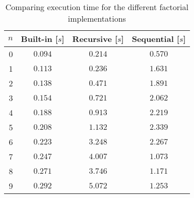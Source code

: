 \begin{table}[htp]
	\begin{center}
	\caption{Comparing execution time for
the different factorial implementations}
	\label{tab:facT}
		\begin{tabular}{rccc}
		\toprule
			{$n$} & {Built-in [$s$]} & {Recursive [$s$]} & {Sequential [$s$]}\\
			\midrule
			{0} & $0.094$ & $0.214$ & $0.570$\\
			{1} & $0.113$ & $0.236$ & $1.631$\\
			{2} & $0.138$ & $0.471$ & $1.891$\\
			{3} & $0.154$ & $0.721$ & $2.062$\\
			{4} & $0.188$ & $0.913$ & $2.219$\\
			{5} & $0.208$ & $1.132$ & $2.339$\\
			{6} & $0.223$ & $3.248$ & $2.267$\\
			{7} & $0.247$ & $4.007$ & $1.073$\\
			{8} & $0.271$ & $3.746$ & $1.171$\\
			{9} & $0.292$ & $5.072$ & $1.253$\\
		\bottomrule
		\end{tabular}
	\end{center}
\end{table}